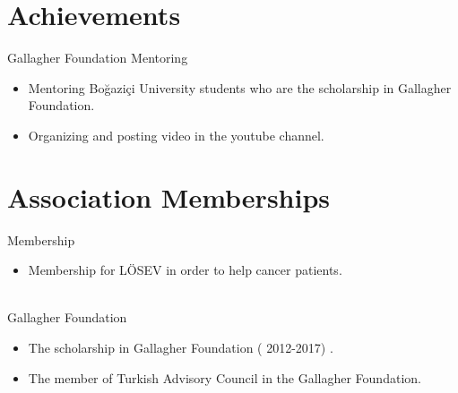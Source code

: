 \documentclass[letterpaper]{ragip_class} %
\begin{document}
\section{Achievements}

\begin{twenty} %
	\twentyitem
	{Gallagher}
	{Foundation}
	{\hspace{0.3cm}Mentoring}
	{}
	{}
	{\begin{itemize}
			\item Mentoring Boğaziçi University students who are the scholarship in Gallagher Foundation.
			\item Organizing and posting video in the youtube channel.
	\end{itemize}}

\end{twenty}



\section{Association Memberships}

\begin{twenty} %
	\twentyitem
	{Membership}
	{}
	{\hspace{0.3cm}{LÖSEV}}
	{}
	{}
	{\begin{itemize}
			\item Membership for LÖSEV in order to help cancer patients.    
	\end{itemize}}
	\\
	\twentyitem
	{Gallagher}
	{Foundation}
	{\hspace{0.3cm}{Gallagher Foundation}}
	{}
	{}
	{\begin{itemize}
			\item The scholarship in Gallagher Foundation ( 2012-2017) .
			\item The member of Turkish Advisory Council in the Gallagher Foundation.
	\end{itemize}}
	\\
\end{twenty}
\end{document}
